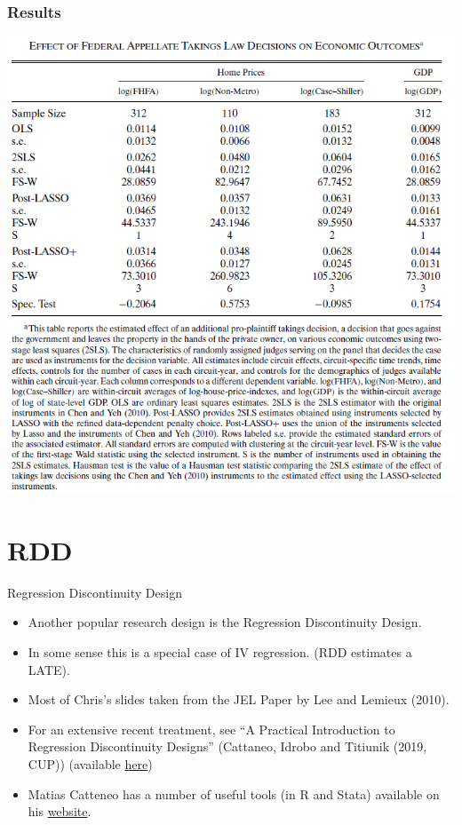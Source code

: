 \begin{frame}
  \frametitle{Results}
  \vspace{-10pt}
  \begin{center}
    \includegraphics[height=.8\textheight]{./resources/belloniTakingsResults}
  \end{center}  
\end{frame}

\section{RDD}
\begin{frame}{Regression Discontinuity Design}
\begin{itemize}
\item Another popular research design is the \alert{Regression Discontinuity Design}.
\item In some sense this is a special case of IV regression. (RDD estimates a LATE).
\item Most of Chris's slides taken from the JEL Paper by Lee and Lemieux (2010).
\item For an extensive recent treatment, see ``A Practical Introduction to Regression Discontinuity Designs'' (Cattaneo, Idrobo and Titiunik (2019, CUP)) (available \href{https://sites.google.com/site/rdpackages/replication/cit-2019-cup}{here})
\item Matias Catteneo has a number of useful tools (in R and Stata) available on his \href{https://sites.google.com/site/matiasdcattaneo/publications}{website}.
\end{itemize}              
\end{frame}


